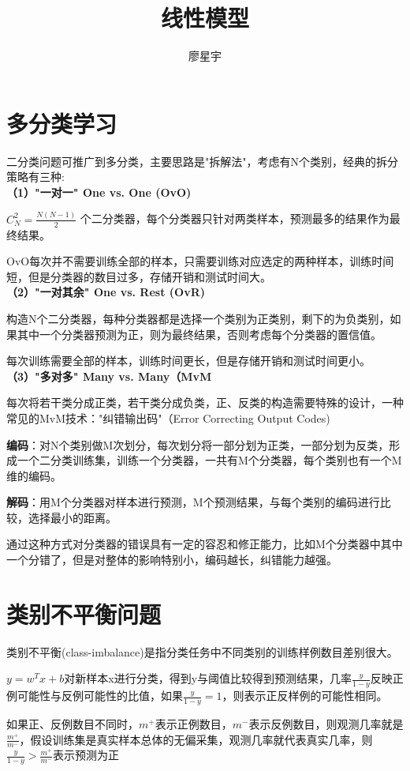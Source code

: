 \documentclass[UTF8]{article}
\author {廖星宇}
\title {线性模型}
\begin{document}
\maketitle
\section{多分类学习}
二分类问题可推广到多分类，主要思路是"拆解法"，考虑有N个类别，经典的拆分策略有三种:
\\

\textbf{（1）"一对一" One vs. One (OvO)}

$C_{N}^{2} = \frac{N(N-1)}{2}$ 个二分类器，每个分类器只针对两类样本，预测最多的结果作为最终结果。

OvO每次并不需要训练全部的样本，只需要训练对应选定的两种样本，训练时间短，但是分类器的数目过多，存储开销和测试时间大。
\\

\textbf{（2）"一对其余" One vs. Rest (OvR)}

构造N个二分类器，每种分类器都是选择一个类别为正类别，剩下的为负类别，如果其中一个分类器预测为正，则为最终结果，否则考虑每个分类器的置信值。

每次训练需要全部的样本，训练时间更长，但是存储开销和测试时间更小。
\\

\textbf{（3）"多对多" Many vs. Many（MvM}

每次将若干类分成正类，若干类分成负类，正、反类的构造需要特殊的设计，一种常见的MvM技术："纠错输出码"（Error Correcting Output Codes)

\textbf{编码}：对N个类别做M次划分，每次划分将一部分划为正类，一部分划为反类，形成一个二分类训练集，训练一个分类器，一共有M个分类器，每个类别也有一个M维的编码。

\textbf{解码}：用M个分类器对样本进行预测，M个预测结果，与每个类别的编码进行比较，选择最小的距离。

通过这种方式对分类器的错误具有一定的容忍和修正能力，比如M个分类器中其中一个分错了，但是对整体的影响特别小，编码越长，纠错能力越强。

\section{类别不平衡问题}
类别不平衡(class-imbalance)是指分类任务中不同类别的训练样例数目差别很大。

$y = w^{T}x + b$对新样本x进行分类，得到y与阈值比较得到预测结果，几率$\frac{y}{1-y}$反映正例可能性与反例可能性的比值，如果$\frac{y}{1-y} = 1$，则表示正反样例的可能性相同。

如果正、反例数目不同时，$m^{+}$表示正例数目，$m^{-}$表示反例数目，则观测几率就是$\frac{m^{+}}{m^{-}}$，假设训练集是真实样本总体的无偏采集，观测几率就代表真实几率，则$\frac{y}{1-y} > \frac{m^{+}}{m^{-}}$表示预测为正
\end{document}
